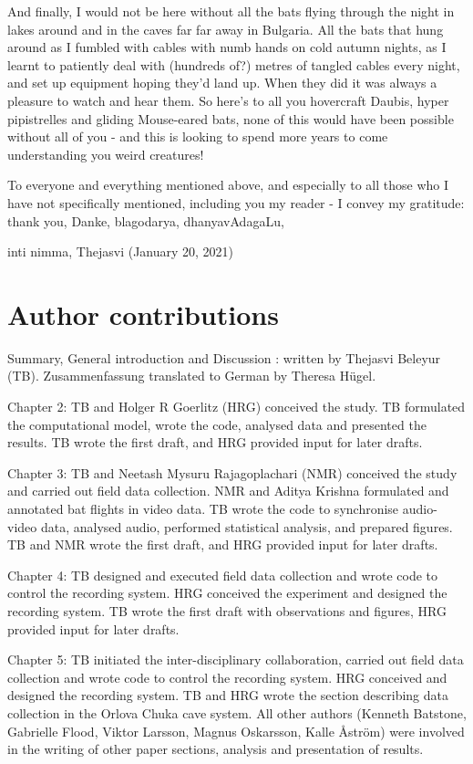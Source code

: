 \documentclass[
]{book}
\begin{document}
And finally, I would not be here without all the bats flying through the night in lakes around and in the caves far far away in Bulgaria. All the bats that hung around as I fumbled with cables with numb hands on cold autumn nights, as I learnt to patiently deal with (hundreds of?) metres of tangled cables every night, and set up equipment hoping they'd land up. When they did it was always a pleasure to watch and hear them. So here's to all you hovercraft Daubis, hyper pipistrelles and gliding Mouse-eared bats, none of this would have been possible without all of you - and this is looking to spend more years to come understanding you weird creatures!

To everyone and everything mentioned above, and especially to all those who I have not specifically mentioned, including you my reader - I convey my gratitude: thank you, Danke, blagodarya, dhanyavAdagaLu,

inti nimma,
Thejasvi (January 20, 2021)

\hypertarget{author-contributions-2}{%
\chapter{Author contributions}\label{author-contributions-2}}

Summary, General introduction and Discussion : written by Thejasvi Beleyur (TB).
Zusammenfassung translated to German by Theresa Hügel.

Chapter 2: TB and Holger R Goerlitz (HRG) conceived the study. TB formulated the computational model, wrote the code, analysed data and presented the results. TB wrote the first draft, and HRG provided input for later drafts.

Chapter 3: TB and Neetash Mysuru Rajagoplachari (NMR) conceived the study and carried out field data collection. NMR and Aditya Krishna formulated and annotated bat flights in video data. TB wrote the code to synchronise audio-video data, analysed audio, performed statistical analysis, and prepared figures. TB and NMR wrote the first draft, and HRG provided input for later drafts.

Chapter 4: TB designed and executed field data collection and wrote code to control the recording system. HRG conceived the experiment and designed the recording system. TB wrote the first draft with observations and figures, HRG provided input for later drafts.

Chapter 5: TB initiated the inter-disciplinary collaboration, carried out field data collection and wrote code to control the recording system. HRG conceived and designed the recording system. TB and HRG wrote the section describing data collection in the Orlova Chuka cave system. All other authors (Kenneth Batstone, Gabrielle Flood, Viktor Larsson, Magnus Oskarsson, Kalle Åström) were involved in the writing of other paper sections, analysis and presentation of results.
\end{document}
